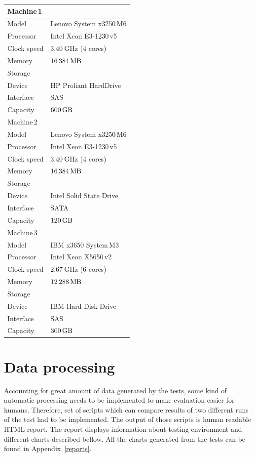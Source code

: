 \documentclass[
  color, %
  table, %
  lof,   %
  lot,   %
]{fithesis3}
\begin{document}
\begin{tabular}{|l|l|}
\hline
   \multicolumn{2}{|l|}{Machine\,1} \\ \hline %
    Model & Lenovo System x3250\,M6 \\
    \hline
    Processor & Intel Xeon E3-1230\,v5 \\
    \hline
    Clock speed & $\SI{3.40}{\giga\hertz}$ (4 cores) \\
    \hline
    Memory & $\SI{16384}{\mega\byte}$ \\
    \hline
    \multicolumn{2}{|l|}{Storage} \\ \hline
    Device & HP Proliant HardDrive\\ \hline
    Interface & SAS\\ \hline
    Capacity & $\SI{600}{\giga\byte}$\\ \hline
\hline
   \multicolumn{2}{|l|}{Machine\,2} \\ \hline %
    Model & Lenovo System x3250\,M6 \\
    \hline
    Processor & Intel Xeon E3-1230\,v5 \\
    \hline
    Clock speed & $\SI{3.40}{\giga\hertz}$ (4 cores) \\
    \hline
    Memory & $\SI{16384}{\mega\byte}$ \\
    \hline
    \multicolumn{2}{|l|}{Storage} \\ \hline
    Device & Intel Solid State Drive \\ \hline
    Interface & SATA\\ \hline
    Capacity & $\SI{120}{\giga\byte}$\\ \hline
\hline
   \multicolumn{2}{|l|}{Machine\,3} \\ \hline %
    Model & IBM x3650 System\,M3 \\
    \hline
    Processor & Intel Xeon X5650\,v2 \\
    \hline
    Clock speed & $\SI{2.67}{\giga\hertz}$  (6 cores) \\
    \hline
    Memory &  $\SI{12288}{\mega\byte}$\\
    \hline
    \multicolumn{2}{|l|}{Storage} \\ \hline
    Device & IBM Hard Disk Drive\\ \hline
    Interface &  SAS\\ \hline
    Capacity & $\SI{300}{\giga\byte}$\\ \hline
\end{tabular}
\label{machines}

\section{Data processing}
Accounting for great amount of data generated by the tests, some kind of automatic processing needs to be implemented to make evaluation easier for humans. Therefore, set of scripts which can compare results of two different runs of the test had to be implemented. The output of those scripts is human readable HTML report. The report displays information about testing environment and different charts described bellow. All the charts generated from the tests can be found in Appendix~\ref{reports}.
\end{document}
